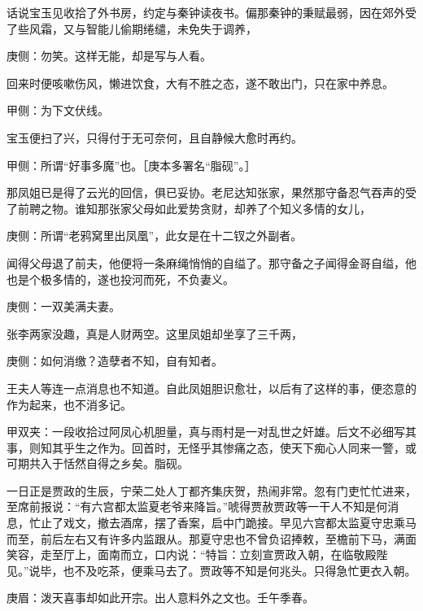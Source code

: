 \begin{parag}
    话说宝玉见收拾了外书房，约定与秦钟读夜书。偏那秦钟的秉赋最弱，因在郊外受了些风霜，又与智能儿偷期绻缱，未免失于调养，\begin{note}庚侧：勿笑。这样无能，却是写与人看。\end{note}回来时便咳嗽伤风，懒进饮食，大有不胜之态，遂不敢出门，只在家中养息。\begin{note}甲侧：为下文伏线。\end{note}宝玉便扫了兴，只得付于无可奈何，且自静候大愈时再约。\begin{note}甲侧：所谓“好事多魔”也。［庚本多署名“脂砚”。］\end{note}
\end{parag}


\begin{parag}
    那凤姐已是得了云光的回信，俱已妥协。老尼达知张家，果然那守备忍气吞声的受了前聘之物。谁知那张家父母如此爱势贪财，却养了个知义多情的女儿，\begin{note}庚侧：所谓“老鸦窝里出凤凰”，此女是在十二钗之外副者。\end{note}闻得父母退了前夫，他便将一条麻绳悄悄的自缢了。那守备之子闻得金哥自缢，他也是个极多情的，遂也投河而死，不负妻义。\begin{note}庚侧：一双美满夫妻。\end{note}张李两家没趣，真是人财两空。这里凤姐却坐享了三千两，\begin{note}庚侧：如何消缴？造孽者不知，自有知者。\end{note}王夫人等连一点消息也不知道。自此凤姐胆识愈壮，以后有了这样的事，便恣意的作为起来，也不消多记。\begin{note}甲双夹：一段收拾过阿凤心机胆量，真与雨村是一对乱世之奸雄。后文不必细写其事，则知其乎生之作为。回首时，无怪乎其惨痛之态，使天下痴心人同来一警，或可期共入于恬然自得之乡矣。脂砚。\end{note}
\end{parag}


\begin{parag}
    一日正是贾政的生辰，宁荣二处人丁都齐集庆贺，热闹非常。忽有门吏忙忙进来，至席前报说：“有六宫都太监夏老爷来降旨。”唬得贾赦贾政等一干人不知是何消息，忙止了戏文，撤去酒席，摆了香案，启中门跪接。早见六宫都太监夏守忠乘马而至，前后左右又有许多内监跟从。那夏守忠也不曾负诏捧敕，至檐前下马，满面笑容，走至厅上，面南而立，口内说：“特旨：立刻宣贾政入朝，在临敬殿陛见。”说毕，也不及吃茶，便乘马去了。贾政等不知是何兆头。只得急忙更衣入朝。\begin{note}庚眉：泼天喜事却如此开宗。出人意料外之文也。壬午季春。\end{note}
\end{parag}


